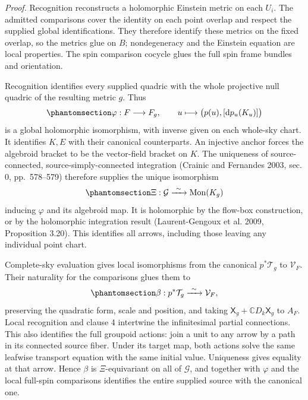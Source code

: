 \documentclass[
  english,
  11pt,
  reqno]{amsart}
\begin{document}
\emph{Proof.} Recognition reconstructs a holomorphic Einstein metric on
each \(U_i\). The admitted comparisons cover the identity on each point
overlap and respect the supplied global identifications. They therefore
identify these metrics on the fixed overlap, so the metrics glue on
\(B\); nondegeneracy and the Einstein equation are local properties. The
spin comparison cocycle glues the full spin frame bundles and
orientation.

Recognition identifies every supplied quadric with the whole projective
null quadric of the resulting metric \(g\). Thus
\begin{equation}\protect\phantomsection\label{eq:monodromy-source-phase-identification}{
\varphi:F\longrightarrow F_g,
\qquad u\longmapsto\bigl(p(u),[\mathrm dp_u(K_u)]\bigr)
}\end{equation} is a global holomorphic isomorphism, with inverse given
on each whole-sky chart. It identifies \(K,E\) with their canonical
counterparts. An injective anchor forces the algebroid bracket to be the
vector-field bracket on \(K\). The uniqueness of source-connected,
source-simply-connected integration (Crainic and Fernandes 2003, sec. 0,
pp.~578--579) therefore supplies the unique isomorphism
\begin{equation}\protect\phantomsection\label{eq:monodromy-source-arrow-identification}{
\Xi:\mathcal G\xrightarrow{\ \sim\ }\operatorname{Mon}(K_g)
}\end{equation} inducing \(\varphi\) and its algebroid map. It is
holomorphic by the flow-box construction, or by the holomorphic
integration result (Laurent-Gengoux et al. 2009, Proposition 3.20). This
identifies all arrows, including those leaving any individual point
chart.

Complete-sky evaluation gives local isomorphisms from the canonical
\(p^*\mathcal T_g\) to \(\mathcal V_F\). Their naturality for the
comparisons glues them to
\begin{equation}\protect\phantomsection\label{eq:monodromy-source-evaluation-counit}{
\beta:p^*\mathcal T_g\xrightarrow{\ \sim\ }\mathcal V_F,
}\end{equation} preserving the quadratic form, scale and position, and
taking \(\mathsf X_g+\mathbb C D_k\mathsf X_g\) to \(A_F\). Local
recognition and clause 4 intertwine the infinitesimal partial
connections. This also identifies the full groupoid actions: join a unit
to any arrow by a path in its connected source fiber. Under its target
map, both actions solve the same leafwise transport equation with the
same initial value. Uniqueness gives equality at that arrow. Hence
\(\beta\) is \(\Xi\)-equivariant on all of \(\mathcal G\), and together
with \(\varphi\) and the local full-spin comparisons identifies the
entire supplied source with the canonical one.
\end{document}
